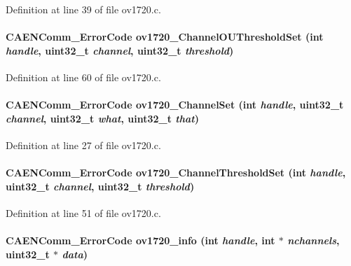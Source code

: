Definition at line 39 of file ov1720.c.
\paragraph[{ov1720\_\-ChannelOUThresholdSet}]{\setlength{\rightskip}{0pt plus 5cm}CAENComm\_\-ErrorCode ov1720\_\-ChannelOUThresholdSet (int {\em handle}, \/  uint32\_\-t {\em channel}, \/  uint32\_\-t {\em threshold})}\hfill\label{ov1720drv_8h_a4c37b778f092b4c80a33969818329408}


Definition at line 60 of file ov1720.c.
\paragraph[{ov1720\_\-ChannelSet}]{\setlength{\rightskip}{0pt plus 5cm}CAENComm\_\-ErrorCode ov1720\_\-ChannelSet (int {\em handle}, \/  uint32\_\-t {\em channel}, \/  uint32\_\-t {\em what}, \/  uint32\_\-t {\em that})}\hfill\label{ov1720drv_8h_ad0814d67c07ad3d78d21497f9dc3e2e3}


Definition at line 27 of file ov1720.c.
\paragraph[{ov1720\_\-ChannelThresholdSet}]{\setlength{\rightskip}{0pt plus 5cm}CAENComm\_\-ErrorCode ov1720\_\-ChannelThresholdSet (int {\em handle}, \/  uint32\_\-t {\em channel}, \/  uint32\_\-t {\em threshold})}\hfill\label{ov1720drv_8h_ab3f695987151872ff15f4cfb06e048b5}


Definition at line 51 of file ov1720.c.
\paragraph[{ov1720\_\-info}]{\setlength{\rightskip}{0pt plus 5cm}CAENComm\_\-ErrorCode ov1720\_\-info (int {\em handle}, \/  int $\ast$ {\em nchannels}, \/  uint32\_\-t $\ast$ {\em data})}\hfill\label{ov1720drv_8h_adf1bdbfb68a41b76abe94188d0a8cb7f}



